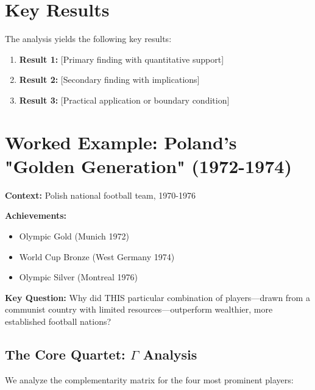 \section{Key Results}
\label{sec:bm-results}

The analysis yields the following key results:

\begin{enumerate}
    \item \textbf{Result 1:} [Primary finding with quantitative support]
    \item \textbf{Result 2:} [Secondary finding with implications]
    \item \textbf{Result 3:} [Practical application or boundary condition]
\end{enumerate}


\section{Worked Example: Poland's "Golden Generation" (1972-1974)}
\label{sec:bm-poland}

\begin{tcolorbox}[colback=green!5!white, colframe=green!75!black, title=Case Study: Orły Górskiego (Górski's Eagles)]

\textbf{Context:} Polish national football team, 1970-1976

\textbf{Achievements:}
\begin{itemize}
    \item Olympic Gold (Munich 1972)
    \item World Cup Bronze (West Germany 1974)
    \item Olympic Silver (Montreal 1976)
\end{itemize}

\textbf{Key Question:} Why did THIS particular combination of players—drawn
from a communist country with limited resources—outperform wealthier,
more established football nations?

\end{tcolorbox}

\subsection{The Core Quartet: $\Gamma$ Analysis}

We analyze the complementarity matrix for the four most prominent players:

